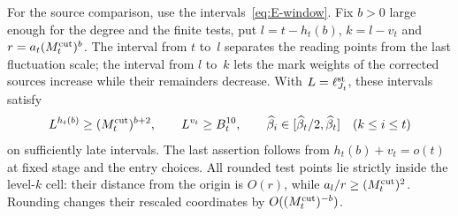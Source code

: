 For the source comparison, use the intervals~\eqref{eq:E-window}. Fix $b>0$ large enough for the degree and the finite tests, put $l=t-h_t(b)$, $k=l-v_t$ and $r=a_t(M^{\mathrm{cut}}_t)^b$. The interval from $t$ to~$l$ separates the reading points from the last fluctuation scale; the interval from $l$ to~$k$ lets the mark weights of the corrected sources increase while their remainders decrease. With $L=\ell_{J_t}^{\rm st}$, these intervals satisfy
\begin{equation}\label{eq:E-window-geometry}
 L^{h_t(b)}\ge(M^{\mathrm{cut}}_t)^{b+2},\qquad
 L^{v_t}\ge B_t^{10},\qquad
 \widehat\beta_i\in[\widehat\beta_t/2,\widehat\beta_t]\quad(k\le i\le t)
\end{equation}
on sufficiently late intervals. The last assertion follows from $h_t(b)+v_t=o(t)$ at fixed stage and the entry choices. All rounded test points lie strictly inside the level-$k$ cell: their distance from the origin is $O(r)$, while $a_l/r\ge(M^{\mathrm{cut}}_t)^2$. Rounding changes their rescaled coordinates by $O((M^{\mathrm{cut}}_t)^{-b})$.

